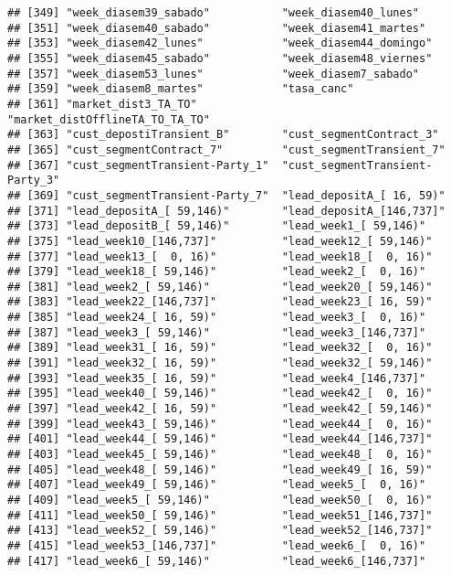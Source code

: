 \documentclass[
]{book}
\begin{document}
\begin{verbatim}
## [349] "week_diasem39_sabado"           "week_diasem40_lunes"           
## [351] "week_diasem40_sabado"           "week_diasem41_martes"          
## [353] "week_diasem42_lunes"            "week_diasem44_domingo"         
## [355] "week_diasem45_sabado"           "week_diasem48_viernes"         
## [357] "week_diasem53_lunes"            "week_diasem7_sabado"           
## [359] "week_diasem8_martes"            "tasa_canc"                     
## [361] "market_dist3_TA_TO"             "market_distOfflineTA_TO_TA_TO" 
## [363] "cust_depostiTransient_B"        "cust_segmentContract_3"        
## [365] "cust_segmentContract_7"         "cust_segmentTransient_7"       
## [367] "cust_segmentTransient-Party_1"  "cust_segmentTransient-Party_3" 
## [369] "cust_segmentTransient-Party_7"  "lead_depositA_[ 16, 59)"       
## [371] "lead_depositA_[ 59,146)"        "lead_depositA_[146,737]"       
## [373] "lead_depositB_[ 59,146)"        "lead_week1_[ 59,146)"          
## [375] "lead_week10_[146,737]"          "lead_week12_[ 59,146)"         
## [377] "lead_week13_[  0, 16)"          "lead_week18_[  0, 16)"         
## [379] "lead_week18_[ 59,146)"          "lead_week2_[  0, 16)"          
## [381] "lead_week2_[ 59,146)"           "lead_week20_[ 59,146)"         
## [383] "lead_week22_[146,737]"          "lead_week23_[ 16, 59)"         
## [385] "lead_week24_[ 16, 59)"          "lead_week3_[  0, 16)"          
## [387] "lead_week3_[ 59,146)"           "lead_week3_[146,737]"          
## [389] "lead_week31_[ 16, 59)"          "lead_week32_[  0, 16)"         
## [391] "lead_week32_[ 16, 59)"          "lead_week32_[ 59,146)"         
## [393] "lead_week35_[ 16, 59)"          "lead_week4_[146,737]"          
## [395] "lead_week40_[ 59,146)"          "lead_week42_[  0, 16)"         
## [397] "lead_week42_[ 16, 59)"          "lead_week42_[ 59,146)"         
## [399] "lead_week43_[ 59,146)"          "lead_week44_[  0, 16)"         
## [401] "lead_week44_[ 59,146)"          "lead_week44_[146,737]"         
## [403] "lead_week45_[ 59,146)"          "lead_week48_[  0, 16)"         
## [405] "lead_week48_[ 59,146)"          "lead_week49_[ 16, 59)"         
## [407] "lead_week49_[ 59,146)"          "lead_week5_[  0, 16)"          
## [409] "lead_week5_[ 59,146)"           "lead_week50_[  0, 16)"         
## [411] "lead_week50_[ 59,146)"          "lead_week51_[146,737]"         
## [413] "lead_week52_[ 59,146)"          "lead_week52_[146,737]"         
## [415] "lead_week53_[146,737]"          "lead_week6_[  0, 16)"          
## [417] "lead_week6_[ 59,146)"           "lead_week6_[146,737]"          

\end{verbatim}
\end{document}
